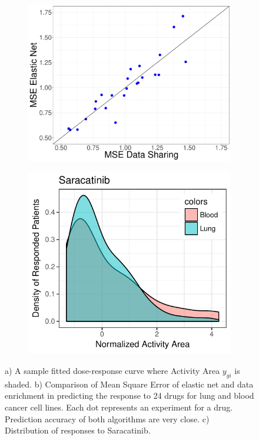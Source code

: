 \begin{figure}
\begin{subfigure}[b]{0.30\textwidth}
		\includegraphics[width=\textwidth]{./img/MSEComparison.pdf}
		\caption{}\label{fig:prediction}
	\end{subfigure}
	\begin{subfigure}[b]{0.29\textwidth}
	\includegraphics[width=\textwidth,]{./img/Saracatinib.pdf}
	\caption{}\label{fig:Saracatinib}
	\end{subfigure}
	\caption{a) A sample fitted dose-response curve where Activity Area $y_{gi}$ is shaded. b) Comparison of Mean Square Error of elastic net and data enrichment in predicting the response to 24 drugs for lung and blood cancer cell lines. Each dot represents an experiment for a drug. Prediction accuracy of both algorithms are very close. c) Distribution of responses to Saracatinib.}
	\label{fig syn2}
	\end{figure}

